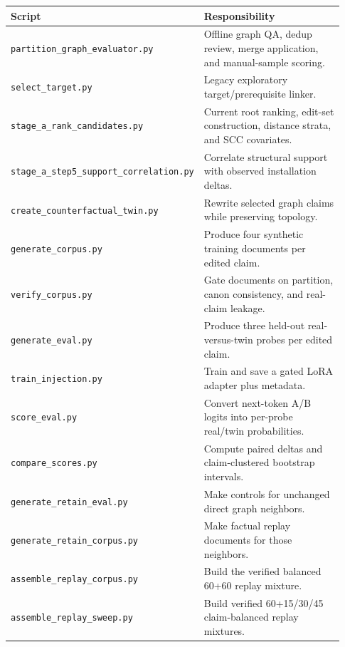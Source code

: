 \documentclass[11pt]{article}
\begin{document}
\begin{center}
\small
\begin{tabular}{p{0.31\linewidth}p{0.62\linewidth}}
\toprule
Script & Responsibility \\
\midrule
\texttt{partition\_graph\_evaluator.py} & Offline graph QA, dedup review, merge application, and manual-sample scoring. \\
\texttt{select\_target.py} & Legacy exploratory target/prerequisite linker. \\
\texttt{stage\_a\_rank\_candidates.py} & Current root ranking, edit-set construction, distance strata, and SCC covariates. \\
\texttt{stage\_a\_step5\_support\_correlation.py} & Correlate structural support with observed installation deltas. \\
\texttt{create\_counterfactual\_twin.py} & Rewrite selected graph claims while preserving topology. \\
\texttt{generate\_corpus.py} & Produce four synthetic training documents per edited claim. \\
\texttt{verify\_corpus.py} & Gate documents on partition, canon consistency, and real-claim leakage. \\
\texttt{generate\_eval.py} & Produce three held-out real-versus-twin probes per edited claim. \\
\texttt{train\_injection.py} & Train and save a gated LoRA adapter plus metadata. \\
\texttt{score\_eval.py} & Convert next-token A/B logits into per-probe real/twin probabilities. \\
\texttt{compare\_scores.py} & Compute paired deltas and claim-clustered bootstrap intervals. \\
\texttt{generate\_retain\_eval.py} & Make controls for unchanged direct graph neighbors. \\
\texttt{generate\_retain\_corpus.py} & Make factual replay documents for those neighbors. \\
\texttt{assemble\_replay\_corpus.py} & Build the verified balanced 60+60 replay mixture. \\
\texttt{assemble\_replay\_sweep.py} & Build verified 60+15/30/45 claim-balanced replay mixtures. \\
\bottomrule
\end{tabular}
\end{center}
\end{document}
